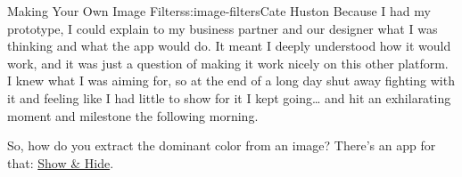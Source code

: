 \begin{aosachapter}{Making Your Own Image Filters}{s:image-filters}{Cate Huston}
Because I had my prototype, I could explain to my business partner and
our designer what I was thinking and what the app would do. It meant I
deeply understood how it would work, and it was just a question of
making it work nicely on this other platform. I knew what I was aiming
for, so at the end of a long day shut away fighting with it and feeling
like I had little to show for it I kept going\ldots{} and hit an
exhilarating moment and milestone the following morning.

So, how do you extract the dominant color from an image? There's an app
for that: \href{showandhide.com}{Show \& Hide}.

\end{aosachapter}
